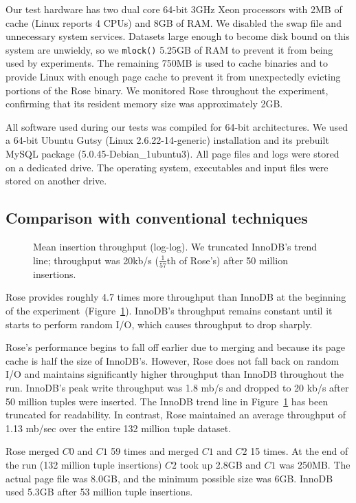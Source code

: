 \documentclass{vldb}
\newcommand{\rows}{Rose\xspace}
\newcommand{\rowss}{Rose's\xspace}
\begin{document}
Our test hardware has two dual core 64-bit 3GHz Xeon processors with
2MB of cache (Linux reports 4 CPUs) and 8GB of RAM.  We disabled the
swap file and unnecessary system services.  Datasets large enough to
become disk bound on this system are unwieldy, so we {\tt mlock()} 5.25GB of
RAM to prevent it from being used by experiments.
The remaining 750MB is used to cache
binaries and to provide Linux with enough page cache to prevent it
from unexpectedly evicting portions of the \rows binary.  We monitored
\rows throughout the experiment, confirming that its resident memory
size was approximately 2GB.

All software used during our tests was compiled for 64-bit
architectures.  We used a 64-bit Ubuntu Gutsy (Linux
2.6.22-14-generic) installation and its prebuilt MySQL package
(5.0.45-Debian\_1ubuntu3).  All page files and logs
were stored on a dedicated drive.  The operating system, executables
and input files were stored on another drive.

\subsection{Comparison with conventional techniques}

\begin{figure}
\centering {}
\caption{Mean insertion throughput (log-log).  We truncated InnoDB's
  trend line; throughput was 20kb/s ($\frac{1}{57}$th of \rowss)
  after 50 million insertions.}
\label{fig:avg-thru}
\end{figure}

\rows provides roughly 4.7 times more throughput than InnoDB at the
beginning of the experiment~(Figure~\ref{fig:avg-thru}).  InnoDB's
throughput remains constant until it starts to perform random
I/O, which causes throughput to drop sharply.

\rowss performance begins to fall off earlier due to merging and
because its page cache is half the size of InnoDB's.  However, \rows does
not fall back on random I/O and maintains significantly higher
throughput than InnoDB throughout the run.  InnoDB's peak write
throughput was 1.8 mb/s and dropped to 20 kb/s after 50 million tuples
were inserted.  The InnoDB trend line in Figure~\ref{fig:avg-thru} has
been truncated for readability.  In contrast, \rows maintained an
average throughput of 1.13 mb/sec over the entire 132 million tuple
dataset.

\rows merged $C0$ and $C1$ 59 times and merged $C1$ and $C2$ 15 times.
At the end of the run (132 million tuple insertions) $C2$ took up
2.8GB and $C1$ was 250MB.  The actual page
file was 8.0GB, and the minimum possible size was 6GB.  InnoDB used
5.3GB after 53 million tuple insertions.
\end{document}
